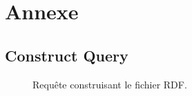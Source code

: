 \chapter{Annexe}
\section{Construct Query}
\begin{figure}[H]

\caption{Requête construisant le fichier RDF.}
\end{figure}
\label{annex:construct}